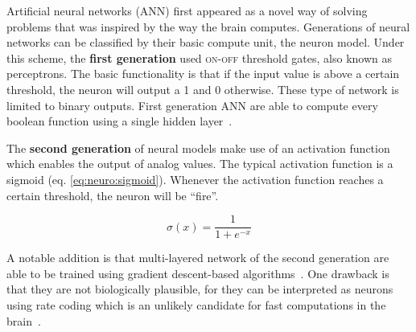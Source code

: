 Artificial neural networks (ANN) first appeared as a novel way of solving problems that was inspired by the way the brain computes. Generations of neural networks can be classified by their basic compute unit, the neuron model. Under this scheme, the \textbf{first generation} used \textsc{on-off} threshold gates, also known as perceptrons. The basic functionality is that if the input value is above a certain threshold, the neuron will output a 1 and 0 otherwise. These type of network is limited to binary outputs. First generation ANN are able to compute every boolean function using a single hidden layer~\cite{third-gen-nn-Maass1997}.

The \textbf{second generation} of neural models make use of an activation function which enables the output of analog values. The typical activation function is a sigmoid (eq. \ref{eq:neuro:sigmoid}). Whenever the activation function reaches a certain threshold, the neuron will be ``fire''.

\begin{equation}
  \sigma(x) = \frac{1}{1 + e^{-x}}
  \label{eq:neuro:sigmoid}
\end{equation}

A notable addition is that multi-layered network of the second generation are able to be trained using gradient descent-based algorithms~\cite{hecht1989-backprop-theory}. One drawback is that they are not biologically plausible, for they can be interpreted as neurons using rate coding which is an unlikely candidate for fast computations in the brain~\cite{third-gen-nn-Maass1997}.

